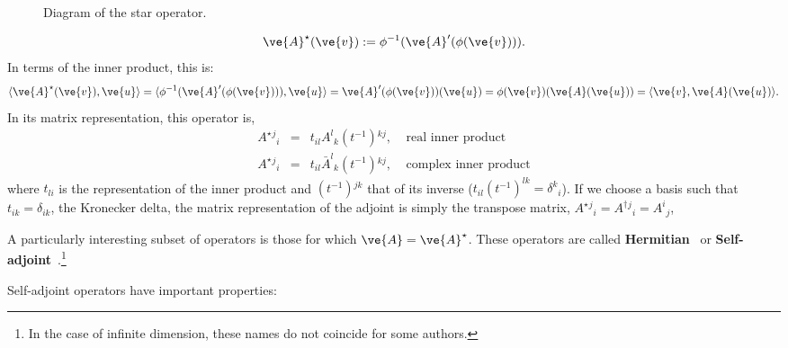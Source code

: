 {%



\espa 


\begin{figure}[htbp]
  \begin{center}
    \caption{Diagram of the star operator.}
    \label{fig:2_3}
  \end{center}
\end{figure}

\begin{equation}
  \label{eq:A_adjunto}
  \ve{A}^{\star}(\ve{v}) := \phi^{-1}(\ve{A}'(\phi(\ve{v}))).
\end{equation}
%
In terms of the inner product, this is:
\begin{equation}
  \label{eq:A_adjunto_2}
  \langle \ve{A}^{\star}(\ve{v}),\ve{u} \rangle = \langle \phi^{-1}(\ve{A}'(\phi(\ve{v}))),\ve{u} \rangle
                                               = \ve{A}'(\phi(\ve{v}))(\ve{u}) 
                                               = \phi(\ve{v})(\ve{A}(\ve{u}))
                                               = \langle \ve{v},\ve{A}(\ve{u}) \rangle.
\end{equation}
%
In its matrix representation, this operator is, 
\begin{eqnarray}
A^{\star}{}^j{}_i &=& t_{il} A^l{}_k (t^{-1}){}^{kj} , \;\;\;\; \mbox{real inner product} \\
A^{\star}{}^j{}_i &=& t_{il} \bar{A}^l{}_k (t^{-1}){}^{kj} , \;\;\;\; \mbox{complex inner product} 
\end{eqnarray}
%
where $t_{li}$ is the representation of the inner product and $(t^{-1}){}^{jk}$ that of its inverse 
($t_{il} (t^{-1})^{lk} = \delta^k{}_i$). 
If we choose a basis such that $t_{ik} = \delta_{ik}$, the Kronecker delta, the matrix representation of the adjoint is simply the transpose matrix, $A^{\star}{}^j{}_i = A^{\dagger}{}^j{}_i = A^i{}_j$, 

A particularly interesting subset of operators is those for which 
$\ve{A} = \ve{A}^{\star}$. These operators are called 
\textbf{Hermitian}~ or 
\textbf{Self-adjoint}~.\footnote{
In the case of infinite dimension, these names do not coincide for
some authors.}

Self-adjoint operators have important properties:

}

